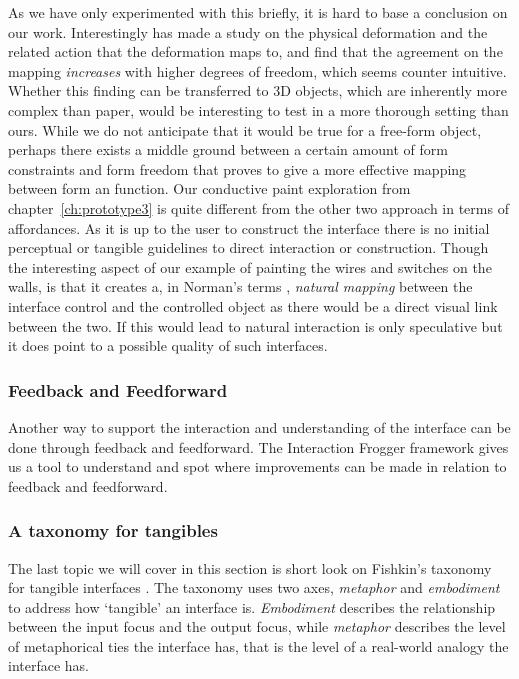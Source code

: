 As we have only experimented with this briefly, it is hard to base a conclusion on our work.
Interestingly \citet{lee2010users} has made a study on the physical deformation and the related action that the deformation maps to, and find that the agreement on the mapping \emph{increases} with higher degrees of freedom, which seems counter intuitive.
Whether this finding can be transferred to 3D objects, which are inherently more complex than paper, would be interesting to test in a more thorough setting than ours.
While we do not anticipate that it would be true for a free-form object, perhaps there exists a middle ground between a certain amount of form constraints and form freedom that proves to give a more effective mapping between form an function.
\blank
Our conductive paint exploration from chapter~\ref{ch:prototype3} is quite different from the other two approach in terms of affordances.
As it is up to the user to construct the interface there is no initial perceptual or tangible guidelines to direct interaction or construction. Though the interesting aspect of our example of painting the wires and switches on the walls, is that it creates a, in Norman's terms \citep{norman2002design}, \emph{natural mapping} between the interface control and the controlled object as there would be a direct visual link between the two.
If this would lead to natural interaction is only speculative but it does point to a possible quality of such interfaces. 

\subsubsection{Feedback and Feedforward}
Another way to support the interaction and understanding of the interface can be done through feedback and feedforward.
The Interaction Frogger framework \citep{stienstra2012design,wensveen2004interaction} gives us a tool to understand and spot where improvements can be made in relation to feedback and feedforward.


\subsubsection{A taxonomy for tangibles}
The last topic we will cover in this section is short look on Fishkin's taxonomy for tangible interfaces \citep{fishkin2004taxonomy}.
The taxonomy uses two axes, \emph{metaphor} and \emph{embodiment} to address how `tangible' an interface is.
\emph{Embodiment} describes the relationship between the input focus and the output focus, while \emph{metaphor} describes the level of metaphorical ties the interface has, that is the level of a real-world analogy the interface has.

